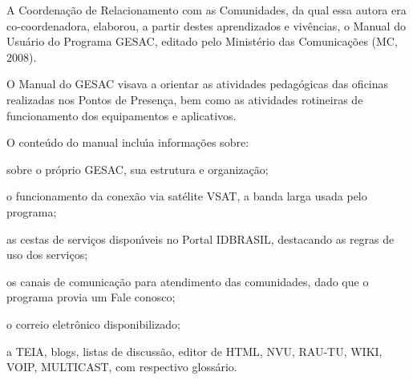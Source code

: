 \documentclass[
12pt,		%
openright,	%
twoside,  %
a4paper,			%
chapter=TITLE,		%
english,			%
french,				%
spanish,			%
brazil				%
]{USPSC-classe/USPSC}
\begin{document}
A Coordena\c{c}\~ao de Relacionamento com as Comunidades, da qual essa autora era co-coordenadora, elaborou, a partir destes aprendizados e viv\^encias, o \textquotedbl Manual do Usu\'ario do Programa GESAC\textquotedbl , editado pelo Minist\'erio das Comunica\c{c}\~oes (MC, 2008).








O Manual do GESAC visava a orientar as atividades pedag\'ogicas das oficinas realizadas nos Pontos de Presen\c{c}a, bem como as  atividades rotineiras de funcionamento dos equipamentos e aplicativos.








O conte\'udo do manual inclu\'{\i}a informa\c{c}\~oes sobre:









\begin{alineas}
\item sobre o pr\'oprio GESAC, sua estrutura e organiza\c{c}\~ao;
\item o funcionamento da conex\~ao via sat\'elite VSAT, a banda larga usada pelo programa;
\item as cestas de servi\c{c}os dispon\'{\i}veis no Portal IDBRASIL, destacando as regras de uso dos servi\c{c}os;
\item os canais de comunica\c{c}\~ao para atendimento das comunidades, dado que o programa provia um \textquotedbl Fale conosco\textquotedbl ;
\item  o correio eletr\^onico disponibilizado;
\item a TEIA, blogs, listas de discuss\~ao, editor de HTML, NVU, RAU-TU, WIKI, VOIP, MULTICAST, com respectivo gloss\'ario.
\end{alineas}


\noindent\begin{center}\mbox{\centering{}}\end{center}
\end{document}
